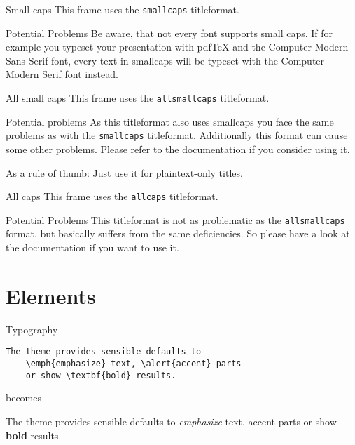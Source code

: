 \documentclass[10pt]{beamer}
\begin{document}
    {
    \begin{frame}{Small caps}
        This frame uses the \texttt{smallcaps} titleformat.
    
        \begin{alertblock}{Potential Problems}
            Be aware, that not every font supports small caps. If for example you typeset your presentation with pdfTeX and the Computer Modern Sans Serif font, every text in smallcaps will be typeset with the Computer Modern Serif font instead.
        \end{alertblock}
    \end{frame}
    }
    
    {

    \begin{frame}{All small caps}
        This frame uses the \texttt{allsmallcaps} titleformat.
    
        \begin{alertblock}{Potential problems}
            As this titleformat also uses smallcaps you face the same problems as with the \texttt{smallcaps} titleformat. Additionally this format can cause some other problems. Please refer to the documentation if you consider using it.
    
            As a rule of thumb: Just use it for plaintext-only titles.
        \end{alertblock}
    \end{frame}
    }
    
    {
    \begin{frame}{All caps}
        This frame uses the \texttt{allcaps} titleformat.
    
        \begin{alertblock}{Potential Problems}
            This titleformat is not as problematic as the \texttt{allsmallcaps} format, but basically suffers from the same deficiencies. So please have a look at the documentation if you want to use it.
        \end{alertblock}
    \end{frame}
    }
    
    \section{Elements}
    
    \begin{frame}[fragile]{Typography}
          \begin{verbatim}The theme provides sensible defaults to
    \emph{emphasize} text, \alert{accent} parts
    or show \textbf{bold} results.\end{verbatim}
    
      \begin{center}becomes\end{center}
    
      The theme provides sensible defaults to \emph{emphasize} text,
      \alert{accent} parts or show \textbf{bold} results.
    \end{frame}
    
\end{document}
